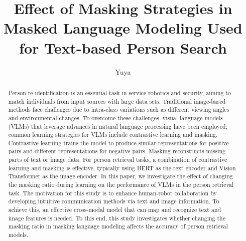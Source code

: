 \documentclass[mscthesis,english,oneside,biblatex,imlex]{template/uefcsthesis}
\title{Effect of Masking Strategies in Masked Language Modeling Used for Text-based Person Search} %
\author{Yuya}{Takagi} %
\date{\thismonth} %
\begin{document}
\maketitle

\begin{abstract}
Person re-identification is an essential task in service robotics and security, aiming to match individuals from input sources with large data sets. Traditional image-based methods face challenges due to intra-class variations such as different viewing angles and environmental changes. To overcome these challenges, visual language models (VLMs) that leverage advances in natural language processing have been employed; common learning strategies for VLMs include contrastive learning and masking. Contrastive learning trains the model to produce similar representations for positive pairs and different representations for negative pairs. Masking reconstructs missing parts of text or image data.
For person retrieval tasks, a combination of contrastive learning and masking is effective, typically using BERT as the text encoder and Vision Transformer as the image encoder. In this paper, we investigate the effect of changing the masking ratio during learning on the performance of VLMs in the person retrieval task. The motivation for this study is to enhance human-robot collaboration by developing intuitive communication methods via text and image information. To achieve this, an effective cross-modal model that can map and recognize text and image features is needed. To this end, this study investigates whether changing the masking ratio in masking language modeling affects the accuracy of person retrieval models.
\end{abstract}

\frontmatter
\tableofcontents
\mainmatter


% 


% 



\appendix
% 



\printnoidxglossaries

\printbibliography[heading=bibintoc]

\backmatter %
\end{document}
